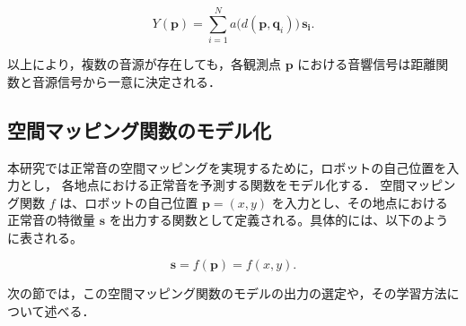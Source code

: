 \documentclass[../main]{subfiles}
\begin{document}
\begin{equation}
  Y(\mathbf{p}) = \sum_{i=1}^{N} a\bigl(d(\mathbf{p}, \mathbf{q}_i)\bigr) \, \mathbf{s_i}.
\end{equation}


以上により，複数の音源が存在しても，各観測点 \(\mathbf{p}\) における音響信号は距離関数と音源信号から一意に決定される．


\subsection{空間マッピング関数のモデル化}
本研究では正常音の空間マッピングを実現するために，ロボットの自己位置を入力とし，
各地点における正常音を予測する関数をモデル化する．
空間マッピング関数 \( f \) は、ロボットの自己位置 \( \mathbf{p} = (x, y) \) を入力とし、その地点における正常音の特徴量 \( \mathbf{s} \) を出力する関数として定義される。具体的には、以下のように表される。

\begin{equation}
  \mathbf{s} = f(\mathbf{p}) = f(x, y).
\end{equation}

次の節では，この空間マッピング関数のモデルの出力の選定や，その学習方法について述べる．
\end{document}
